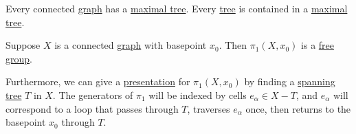 \begin{theorem}
	Every connected \hyperref[def:graph]{graph} has a \hyperref[def:maximal-tree]{maximal tree}.
	Every \hyperref[def:tree]{tree} is contained in a \hyperref[def:maximal-tree]{maximal tree}.
\end{theorem}

\begin{corollary}
	Suppose \(X\) is a connected \hyperref[def:graph]{graph} with basepoint \(x_0\). Then \(\pi _1(X, x_0)\) is a
	\hyperref[def:free-group]{free group}.

	\par Furthermore, we can give a \hyperref[def:group-presentation]{presentation} for \(\pi _1(X, x_0)\) by finding a
	\hyperref[def:maximal-tree]{spanning tree} \(T\) in \(X\). The generators of
	\(\pi _1\) will be indexed by cells \(e_\alpha \in X-T\), and \(e_\alpha \) will correspond to a loop that passes through \(T\),
	traverses \(e_\alpha \) once, then returns to the basepoint \(x_0\) through \(T\).
\end{corollary}
